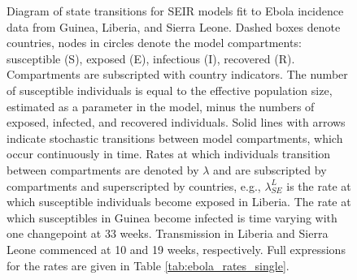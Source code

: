 \begin{figure}[htbp]
\begin{fullpage}
{
		}
		\caption[Diagram of single country SEIR models for the Ebola outbreak in West Africa.]{Diagram of state transitions for SEIR models fit to Ebola incidence data from Guinea, Liberia, and Sierra Leone. Dashed boxes denote countries, nodes in circles denote the model compartments: susceptible (S), exposed (E), infectious (I), recovered (R). Compartments  are subscripted with country indicators. The number of susceptible individuals is equal to the effective population size, estimated as a parameter in the model, minus the numbers of exposed, infected, and recovered individuals. Solid lines with arrows indicate stochastic transitions between model compartments, which occur continuously in time. Rates at which individuals transition between compartments are denoted by $ \lambda $ and are subscripted by compartments and superscripted by countries, e.g., $ \lambda_{SE}^L $ is the rate at which susceptible individuals become exposed in Liberia. The rate at which susceptibles in Guinea become infected is time varying with one changepoint at 33 weeks. Transmission in Liberia and Sierra Leone commenced at 10 and 19 weeks, respectively. Full expressions for the rates are given in Table \ref{tab:ebola_rates_single}.}
		\label{fig:ebola_single_diag}
	\end{fullpage}
\end{figure}

